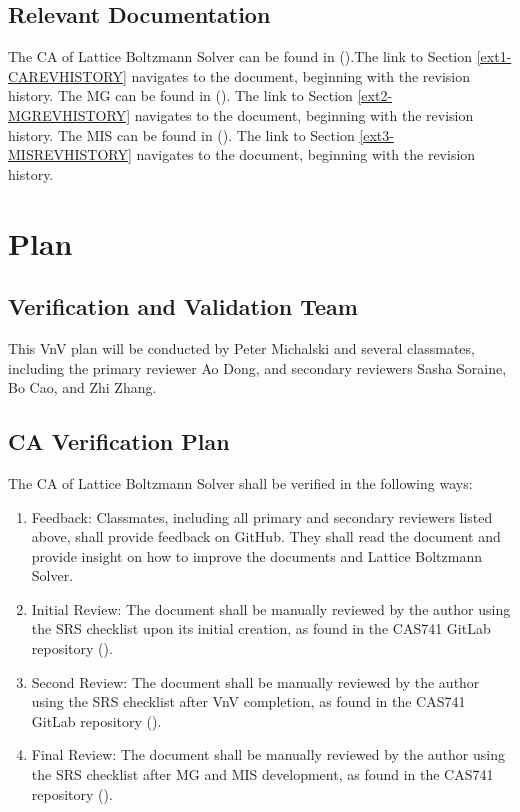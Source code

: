 \documentclass[12pt, titlepage]{article}
\newcommand{\famname}{Lattice Boltzmann Solver}
\begin{document}
\subsection{Relevant Documentation}

The CA of {\famname} can be found in (\citet{LBM_CA_PM}).The link to Section \ref{ext1-CAREVHISTORY} navigates to the document, beginning with the revision history. The MG can be found in (\citet{LBM_MG_PM}). The link to Section \ref{ext2-MGREVHISTORY} navigates to the document, beginning with the revision history. The MIS can be found in (\citet{LBM_MIS_PM}). The link to Section \ref{ext3-MISREVHISTORY} navigates to the document, beginning with the revision history.
\newpage

\section{Plan}
\label{testplan}	
\subsection{Verification and Validation Team}

This VnV plan will be conducted by Peter Michalski and several
classmates, including the primary reviewer Ao Dong, and secondary reviewers Sasha Soraine, Bo Cao, and Zhi Zhang. %

\subsection{CA Verification Plan}

The CA of {\famname} shall be verified in the following ways:

\begin{enumerate}
\item Feedback: Classmates, including all primary and secondary reviewers listed above, shall provide feedback on GitHub. They shall read the document and provide insight on how to improve the documents and {\famname}. %
\item Initial Review: The document shall be manually reviewed by the author
  using the SRS checklist upon its initial creation, as found in the CAS741
  GitLab repository (\citet{CAS741_SRS_checklist}). %
\item Second Review: The document shall be manually reviewed by the author using
  the SRS checklist after VnV completion, as found in the CAS741 GitLab
  repository (\citet{CAS741_SRS_checklist}). %
\item Final Review: The document shall be manually reviewed by the author using
  the SRS checklist after MG and MIS development, as found in the CAS741
  repository (\citet{CAS741_SRS_checklist}). %
\end{enumerate}
\end{document}
